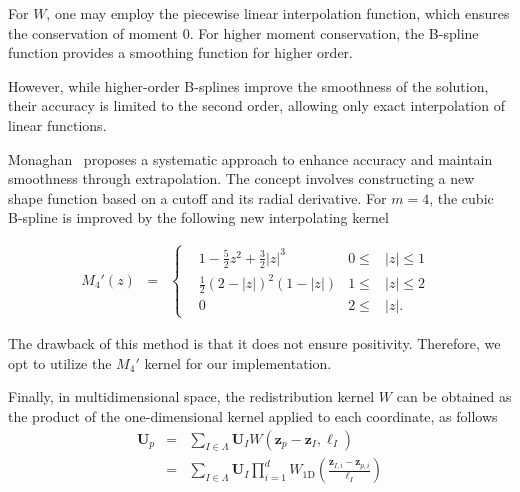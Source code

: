 For $W$, one may employ the piecewise linear interpolation function, which ensures the conservation of moment 0. For higher moment conservation, the B-spline function provides a smoothing function for higher order.

However, while higher-order B-splines improve the smoothness of the solution, their accuracy is limited to the second order, allowing only exact interpolation of linear functions.

Monaghan~\cite{monaghan_extrapolating_1985} proposes a systematic approach to enhance accuracy and maintain smoothness through extrapolation. The concept involves constructing a new shape function based on a cutoff and its radial derivative. For $m = 4$, the cubic B-spline is improved by the following new interpolating kernel

\begin{eqnarray*}~\label{cubic_radial_kernel}
	M_4'(z) &=& \left\{ \begin{aligned}
		 & 1 - \frac{5}{2}z^2 + \frac{3}{2} |z|^3 & 0 \leq & |z| \leq  1 & \\
		 & \frac{1}{2}{(2 - |z|)}^2(1 - |z|)      & 1 \leq & |z| \leq 2  & \\
		 & 0                                      & 2 \leq & |z|.
	\end{aligned}
	\right.
\end{eqnarray*}

The drawback of this method is that it does not ensure positivity. Therefore, we opt to utilize the $M_4'$ kernel for our implementation.

Finally, in multidimensional space, the redistribution kernel $W$ can be obtained as the product of the one-dimensional kernel applied to each coordinate, as follows
\begin{eqnarray*}
	\bm U_p &=& \sum_{I \in \Lambda} \bm U_I  W \left(\bm z_p - \bm z_I, \ell_I \right) \\
	&=&  \sum_{I \in \Lambda} \bm U_I  \prod_{i = 1}^d W_{1\text{D}} \left(\frac{\bm z_{I, i} - \bm z_{p, i}}{\ell_I} \right)
\end{eqnarray*}